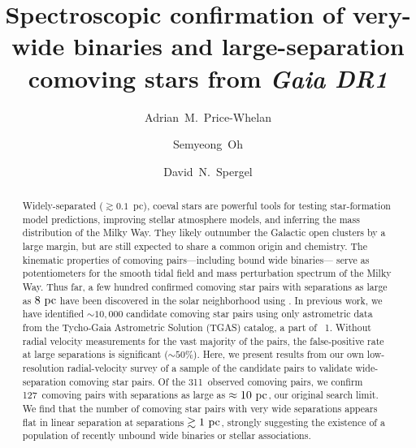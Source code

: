 \documentclass[modern, letterpaper]{aastex61}
\newcommand{\gaia}{\project{Gaia}}
\newcommand{\DR}[1]{\acronym{DR}#1}
\newcommand{\npairsobs}{311}
\newcommand{\ncomoving}{127}
\begin{document}
\sloppy\sloppypar\raggedbottom\frenchspacing %

\title{Spectroscopic confirmation of very-wide binaries and large-separation
       comoving stars from \textsl{Gaia DR1}}

\author{Adrian~M.~Price-Whelan}

\author{Semyeong~Oh}

\author{David~N.~Spergel}




\begin{abstract}
Widely-separated ($\gtrsim 0.1$~pc), coeval stars are powerful tools for
testing star-formation model predictions, improving stellar atmosphere models,
and inferring the mass distribution of the Milky Way.
They likely outnumber the Galactic open clusters by a large margin, but are
still expected to share a common origin and chemistry.
The kinematic properties of comoving pairs---including bound wide binaries---
serve as potentiometers for the smooth tidal field and mass perturbation
spectrum of the Milky Way.
Thus far, a few hundred confirmed comoving star pairs with separations as large
as $8~\mathrm{pc}$ have been discovered in the solar neighborhood using
.
In previous work, we have identified $\sim 10,000$ candidate comoving star pairs
using only astrometric data from the Tycho-Gaia Astrometric Solution (TGAS)
catalog, a part of \gaia\ \DR{1}.
Without radial velocity measurements for the vast majority of the pairs, the
false-positive rate at large separations is significant ($\sim 50\%$).
Here, we present results from our own low-resolution radial-velocity survey of a
sample of the candidate pairs to validate wide-separation comoving star pairs.
Of the \npairsobs\ observed comoving pairs, we confirm \ncomoving\ comoving
pairs with separations as large as $\approx 10~\mathrm{pc}$, our original search limit.
We find that the number of comoving star pairs with very wide separations
appears flat in linear separation at separations $\gtrsim 1~\mathrm{pc}$, strongly
suggesting the existence of a population of recently unbound wide binaries or
stellar associations.
\end{abstract}
\end{document}
